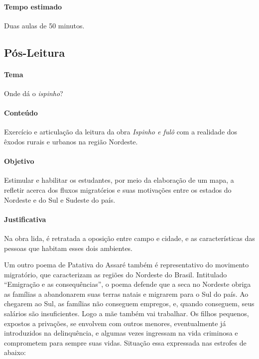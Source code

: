 \documentclass[12pt]{extarticle}
\begin{document}
{\begin{enumerate}
\end{enumerate}

\paragraph{Tempo estimado} Duas aulas de 50 minutos.  

\subsection{Pós-Leitura}

\paragraph{Tema} Onde dá o \textit{ispinho}?

\paragraph{Conteúdo} Exercício e articulação da leitura da obra 
\emph{Ispinho e fulô} com a realidade dos êxodos rurais e urbanos na 
região Nordeste.

\paragraph{Objetivo} Estimular e habilitar os estudantes, por meio da 
elaboração de um mapa, a refletir acerca dos fluxos migratórios e suas 
motivações entre os estados do Nordeste e do Sul e Sudeste do país. 

\paragraph{Justificativa} Na obra lida, é retratada a oposição entre campo 
e cidade, e as características das pessoas que habitam esses dois ambientes.

Um outro poema de Patativa do Assaré também é representativo do movimento 
migratório, que caracterizam as regiões do Nordeste do Brasil. Intitulado 
``Emigração e as consequências'', o poema defende que a seca no Nordeste 
obriga as famílias a abandonarem suas terras natais e migrarem para o 
Sul do país. Ao chegarem ao Sul, as famílias não conseguem empregos, e, 
quando conseguem, seus salários são insuficientes. Logo a mãe também vai 
trabalhar. Os filhos pequenos, expostos a privações, se envolvem com 
outros menores, eventualmente já introduzidos na delinquência, e algumas 
vezes ingressam na vida criminosa e comprometem para sempre suas vidas. 
Situação essa expressada nas estrofes de abaixo:

}
\end{document}
